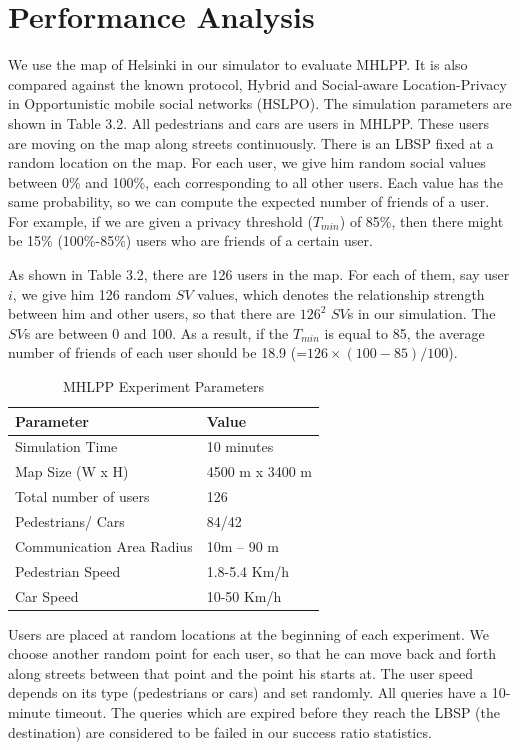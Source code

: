 \section{ Performance Analysis}

\noindent We use the map of Helsinki in our simulator to evaluate MHLPP. It is also compared against the known protocol, Hybrid and Social-aware Location-Privacy in Opportunistic mobile social networks (HSLPO). The simulation parameters are shown in Table 3.2. All pedestrians and cars are users in MHLPP. These users are moving on the map along streets continuously. There is an LBSP fixed at a random location on the map. For each user, we give him random social values between 0\% and 100\%, each corresponding to all other users. Each value has the same probability, so we can compute the expected number of friends of a user. For example, if we are given a privacy threshold (${T}_{min}$) of 85\%, then there might be 15\% (100\%-85\%) users who are friends of a certain user.

\noindent As shown in Table 3.2, there are 126 users in the map. For each of them, say user $i$, we give him 126 random $SV$ values, which denotes the relationship strength between him and other users, so that there are ${126}^2$ $SV$s in our simulation. The $SV$s are between 0 and 100. As a result, if the ${T}_{min}$ is equal to 85, the average number of friends of each user should be 18.9 (=$126\times (100-85)/100$).

\begin{table}
\label{table:MhlppExperimentParameters}
\caption{MHLPP Experiment Parameters}
\centering
\begin{tabular}{|p{2.4in}|p{3.0in}|} \hline 
Parameter & Value \\ \hline 
Simulation Time & 10 minutes \\ \hline 
Map Size (W x H) & 4500 m x 3400 m \\ \hline 
Total number of users & 126 \\ \hline 
Pedestrians/ Cars & 84/42 \\ \hline 
Communication Area Radius & 10m -- 90 m \\ \hline 
Pedestrian Speed & 1.8-5.4 Km/h \\ \hline 
Car Speed & 10-50 Km/h \\ \hline 
\end{tabular}
\end{table}

Users are placed at random locations at the beginning of each experiment. We choose another random point for each user, so that he can move back and forth along streets between that point and the point his starts at. The user speed depends on its type (pedestrians or cars) and set randomly. All queries have a 10-minute timeout. The queries which are expired before they reach the LBSP (the destination) are considered to be failed in our success ratio statistics.

